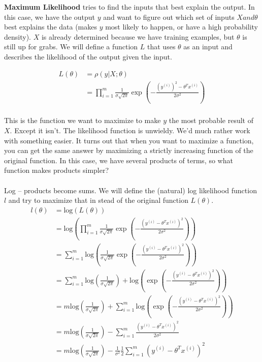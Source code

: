 \documentclass{article}
\begin{document}
\textbf{Maximum Likelihood} tries to find the inputs that best explain the output. In this case, we have the output $y$ and want to figure out which set of inputs $X and \theta$ best explains the data (makes $y$ most likely to happen, or have a high probability density). $X$ is already determined because we have training examples, but $\theta$ is still up for grabs. We will define a function $L$ that uses $\theta$ as an input and describes the likelihood of the output given the input.

\begin{align*}
L(\theta) &= \rho(y|X;\theta)\\
&=\prod_{i=1}^m \frac{1}{\sigma\sqrt{2\pi}} \exp(-\frac{(y^{(i)})^2-\theta^Tx^{(i)}}{2\sigma^2})\\
\end{align*} 

This is the function we want to maximize to make $y$ the most probable result of $X$. Except it isn't. The likelihood function is unwieldy. We'd much rather work with something easier. It turns out that when you want to maximize a function, you can get the same answer by maximizing a strictly increasing function of the original function. In this case, we have several products of terms, so what function makes products simpler?\\
\\
Log -- products become sums. We will define the (natural) log likelihood function $l$ and try to maximize that in stead of the original function $L(\theta)$.\\

\begin{align*}
l(\theta) &= \text{log}(L(\theta))\\
&=\text{log}({\prod_{i=1}^m \frac{1}{\sigma\sqrt{2\pi}} \exp(-\frac{{(y^{(i)}-\theta^Tx^{(i)})}^2}{2\sigma^2})})\\
&=\sum_{i=1}^m \text{log} (\frac{1}{\sigma\sqrt{2\pi}} \exp(-\frac{{(y^{(i)}-\theta^Tx^{(i)})}^2}{2\sigma^2}))\\
&=\sum_{i=1}^m \text{log} (\frac{1}{\sigma\sqrt{2\pi}}) + \text{log} (\exp(-\frac{{(y^{(i)}-\theta^Tx^{(i)})}^2}{2\sigma^2}))\\
&= m\text{log} (\frac{1}{\sigma\sqrt{2\pi}}) + \sum_{i=1}^m\text{log} (\exp(-\frac{{(y^{(i)}-\theta^Tx^{(i)})}^2}{2\sigma^2}))\\
&= m\text{log} (\frac{1}{\sigma\sqrt{2\pi}}) -\sum_{i=1}^m\frac{{(y^{(i)}-\theta^Tx^{(i)})}^2}{2\sigma^2}\\
&= m\text{log} (\frac{1}{\sigma\sqrt{2\pi}}) -\frac{1}{\sigma^2}\frac{1}{2}\sum_{i=1}^m{(y^{(i)}-\theta^Tx^{(i)})}^2\\
\end{align*} 
\end{document}
